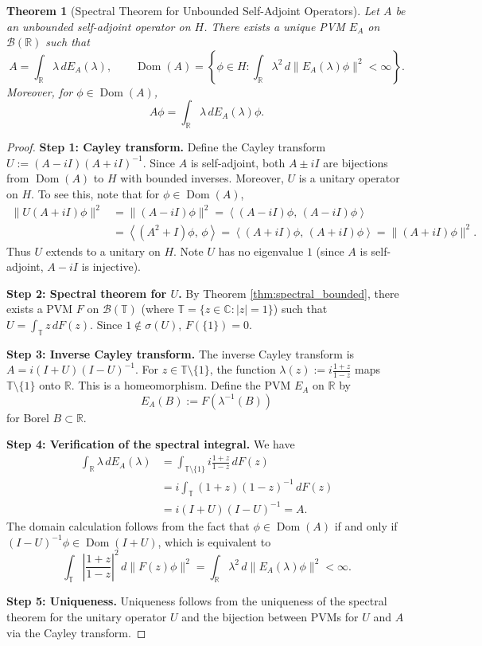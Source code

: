 \documentclass[11pt]{article}
\newtheorem{theorem}{Theorem}[section]
\theoremstyle{definition}
\theoremstyle{remark}
\newcommand{\C}{\mathbb{C}}
\newcommand{\R}{\mathbb{R}}
\newcommand{\1}{\mathbbm{1}}
\newcommand{\ip}[2]{\left\langle #1,\,#2 \right\rangle}
\DeclareMathOperator{\Dom}{Dom}
\begin{document}
\begin{theorem}[Spectral Theorem for Unbounded Self-Adjoint Operators]\label{thm:spectral_unbounded}
Let $A$ be an unbounded self-adjoint operator on $H$. There exists a unique PVM $E_A$ on $\mathcal{B}(\R)$ such that
\[
A=\int_{\R}\lambda\,dE_A(\lambda),\qquad\Dom(A)=\left\{\phi\in H:\int_{\R}\lambda^2\,d\|E_A(\lambda)\phi\|^2<\infty\right\}.
\]
Moreover, for $\phi\in\Dom(A)$,
\[
A\phi=\int_{\R}\lambda\,dE_A(\lambda)\phi.
\]
\end{theorem}

\begin{proof}
\textbf{Step 1: Cayley transform.}
Define the Cayley transform $U:=(A-iI)(A+iI)^{-1}$. Since $A$ is self-adjoint, both $A\pm iI$ are bijections from $\Dom(A)$ to $H$ with bounded inverses. Moreover, $U$ is a unitary operator on $H$. To see this, note that for $\phi\in\Dom(A)$,
\begin{align*}
\|U(A+iI)\phi\|^2&=\|(A-iI)\phi\|^2=\ip{(A-iI)\phi}{(A-iI)\phi}\\
&=\ip{(A^2+I)\phi}{\phi}=\ip{(A+iI)\phi}{(A+iI)\phi}=\|(A+iI)\phi\|^2.
\end{align*}
Thus $U$ extends to a unitary on $H$. Note $U$ has no eigenvalue $1$ (since $A$ is self-adjoint, $A-iI$ is injective).

\textbf{Step 2: Spectral theorem for $U$.}
By Theorem \ref{thm:spectral_bounded}, there exists a PVM $F$ on $\mathcal{B}(\mathbb{T})$ (where $\mathbb{T}=\{z\in\C:|z|=1\}$) such that $U=\int_{\mathbb{T}}z\,dF(z)$. Since $1\notin\sigma(U)$, $F(\{1\})=0$.

\textbf{Step 3: Inverse Cayley transform.}
The inverse Cayley transform is $A=i(I+U)(I-U)^{-1}$. For $z\in\mathbb{T}\setminus\{1\}$, the function $\lambda(z):=i\frac{1+z}{1-z}$ maps $\mathbb{T}\setminus\{1\}$ onto $\R$. This is a homeomorphism. Define the PVM $E_A$ on $\R$ by
\[
E_A(B):=F(\lambda^{-1}(B))
\]
for Borel $B\subset\R$.

\textbf{Step 4: Verification of the spectral integral.}
We have
\begin{align*}
\int_{\R}\lambda\,dE_A(\lambda)&=\int_{\mathbb{T}\setminus\{1\}}i\frac{1+z}{1-z}\,dF(z)\\
&=i\int_{\mathbb{T}}(1+z)(1-z)^{-1}\,dF(z)\\
&=i(I+U)(I-U)^{-1}=A.
\end{align*}
The domain calculation follows from the fact that $\phi\in\Dom(A)$ if and only if $(I-U)^{-1}\phi\in\Dom(I+U)$, which is equivalent to
\[
\int_{\mathbb{T}}\left|\frac{1+z}{1-z}\right|^2\,d\|F(z)\phi\|^2=\int_{\R}\lambda^2\,d\|E_A(\lambda)\phi\|^2<\infty.
\]

\textbf{Step 5: Uniqueness.}
Uniqueness follows from the uniqueness of the spectral theorem for the unitary operator $U$ and the bijection between PVMs for $U$ and $A$ via the Cayley transform.
\end{proof}
\end{document}
